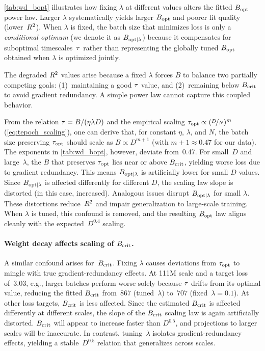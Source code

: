 \cref{tab:wd_bopt} illustrates how fixing $\lambda$ at different
values alters the fitted $B_{\text{opt}}$ power law. Larger $\lambda$
systematically yields larger $B_{\text{opt}}$ and poorer fit quality
(lower~$R^{2}$). When $\lambda$ is fixed, the batch size that
minimizes loss is only a \emph{conditional optimum} (we denote it as
$B_{\text{opt}|\lambda}$) because it compensates for suboptimal
timescales~$\tau$ rather than representing the globally
tuned $B_{\text{opt}}$ obtained when $\lambda$ is optimized jointly.

The degraded $R^{2}$ values arise because a fixed $\lambda$ forces $B$
to balance two partially competing goals: (1)~maintaining a good
$\tau$ value, and (2)~remaining below $B_{\text{crit}}$ to avoid gradient
redundancy. A simple power law cannot capture this coupled behavior.

From the relation $\tau = B/(\eta\lambda D)$ and the empirical
scaling ${\tau}_{\text{opt}} \propto (\nicefrac{D}{N})^{m}$
(\cref{eq:tepoch_scaling}), one can derive that, for constant $\eta$,
$\lambda$, and $N$, the batch size preserving ${\tau}_{\text{opt}}$ should scale
as $B \propto D^{m+1}$ (with $m+1\!\approx\!0.47$ for our data). The
exponents in \cref{tab:wd_bopt}, however, deviate from~0.47. For
small~$D$ and large~$\lambda$, the $B$ that preserves ${\tau}_{\text{opt}}$ lies
near or above $B_{\text{crit}}$, yielding worse loss due to gradient
redundancy.  This means $B_{\text{opt}|\lambda}$ is artificially lower for small
$D$ values. Since $B_{\text{opt}|\lambda}$ is affected differently for different
$D$, the scaling law slope is distorted (in this case,
increased). Analogous issues disrupt $B_{\text{opt}|\lambda}$ for small $\lambda$.
These distortions reduce~$R^{2}$ and impair generalization to
large-scale training. When $\lambda$ is tuned, this confound is
removed, and the resulting $B_{\text{opt}}$ law aligns cleanly with the
expected~$D^{0.4}$ scaling.

\paragraph{Weight decay affects scaling of $B_{\text{crit}}$.}

A similar confound arises for~$B_{\text{crit}}$. Fixing $\lambda$ causes
deviations from ${\tau}_{\text{opt}}$ to mingle with true gradient-redundancy
effects.
%
At 111M scale and a target loss of~3.03, e.g., larger batches perform
worse solely because $\tau$ drifts from its optimal value, reducing
the fitted $B_{\text{crit}}$ from~867 (tuned~$\lambda$) to~707
(fixed~$\lambda{=}0.1$).
%
At other loss targets, $B_{\text{crit}}$ is less affected. Since
the estimated $B_{\text{crit}}$ is affected differently at different scales,
the slope of the $B_{\text{crit}}$ scaling law is again artificially
distorted. $B_{\text{crit}}$ will appear to increase faster than $D^{0.5}$, and
projections to larger scales will be inaccurate.
%
In contrast, tuning~$\lambda$ isolates gradient-redundancy effects,
yielding a stable~$D^{0.5}$ relation that generalizes across scales.
